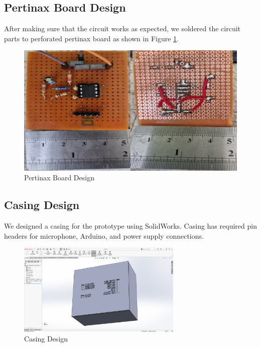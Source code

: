\subsection{Pertinax Board Design}

After making sure that the circuit works as expected, we soldered the circuit parts to perforated pertinax board as shown in Figure \ref{fig:pertinax_board_design}.

\begin{figure}[h]
	\centering
	\includegraphics[width=1\textwidth]{assets/pertinax-design.png}
	\caption{Pertinax Board Design}
	\label{fig:pertinax_board_design}
\end{figure}

\newpage
\thispagestyle{plain}

\subsection{Casing Design}

We designed a casing for the prototype using SolidWorks. Casing has required pin headers for microphone, Arduino, and power supply connections.

\begin{figure}[h]
	\centering
	\includegraphics[width=0.7\textwidth]{assets/3d-design.png}
	\caption{Casing Design}
	\label{fig:casing_design}
\end{figure}

